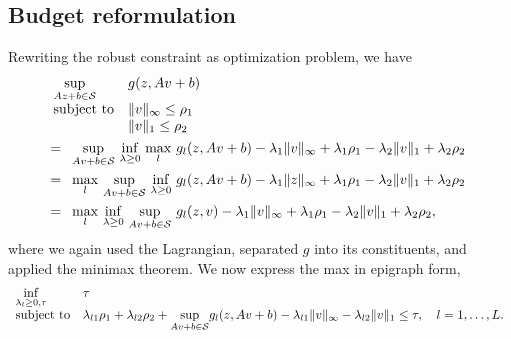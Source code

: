 \subsection{Budget reformulation}
\label{apx:budproof}
Rewriting the robust constraint as optimization problem, we have
\begin{equation*}
	\begin{aligned}
& \begin{array}[t]{ll}
	\underset{Az+b\in \mathcal{S}}{\sup} & g(z,Av+b) \\
	\mbox{subject to} & \| v \|_\infty \le \rho_1\\
	 & \| v \|_1 \le \rho_2\\
\end{array}\\
&= \begin{array}[t]{ll}
	\underset{Av+b\in \mathcal{S}}{\sup}~ \underset{\lambda \geq 0}{\inf} ~\underset{l}{\max} ~ g_l(z,Av+b)  - \lambda_1\| v \|_\infty  + \lambda_1\rho_1 - \lambda_2\| v\|_1  + \lambda_2\rho_2\\
	\end{array}\\
 &=  \begin{array}[t]{ll}
	\underset{l}{\max} ~\underset{Av+b\in \mathcal{S}}{\sup} ~ \underset{\lambda \geq 0}{\inf} ~g_l(z,Av+b)  - \lambda_1\| z \|_\infty  + \lambda_1\rho_1 - \lambda_2\| v\|_1  + \lambda_2\rho_2\\
	\end{array}\\
	&= \begin{array}[t]{ll}
		\underset{l}{\max}~\underset{\lambda \geq 0}{\inf}~\underset{Av+b\in \mathcal{S}}{\sup} ~g_l(z,v)  - \lambda_1\| v\|_\infty  + \lambda_1\rho_1 - \lambda_2\| v \|_1  + \lambda_2\rho_2,\\
		\end{array}\\
\end{aligned}
\end{equation*}
where we again used the Lagrangian, separated $g$ into its constituents, and applied the minimax theorem. We now express the max in epigraph form,
\begin{equation*}
	\begin{aligned}
	\begin{array}[t]{ll}
		\underset{\lambda_{l} \geq 0, \tau}{\inf} & \tau \\
		\mbox{subject to} & \lambda_{l1}\rho_1 + \lambda_{l2}\rho_2 + \underset{Av+b\in \mathcal{S}}{\sup } g_l(z,Av+b) -\lambda_{l1}\| v \|_\infty - \lambda_{l2}\| v \|_1 \leq \tau, \quad l = 1,\dots,L.
	\end{array}
	\end{aligned}
	\end{equation*}

